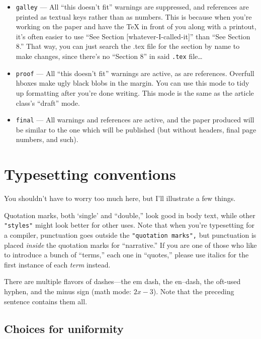 \documentclass[final]{ols}
\begin{document}
\begin{itemize}

\item \texttt{galley} --- All ``this doesn't fit'' warnings are
suppressed, and references are printed as textual keys rather than as
numbers.  This is because when you're working on the paper and have
the TeX in front of you along with a printout, it's often easier to
use ``See Section [whatever-I-called-it]'' than ``See Section 8.''
That way, you can just search the .tex file for the section by name to
make changes, since there's no ``Section 8'' in said \texttt{.tex}
file\ldots

\item \texttt{proof} --- All ``this doesn't fit'' warnings are active,
as are references.  Overfull hboxes make ugly black blobs in the
margin.  You can use this mode to tidy up formatting after you're done
writing.  This mode is the same as the article class's ``draft'' mode.

\item \texttt{final} --- All warnings and references are active, and
the paper produced will be similar to the one which will be
published (but without headers, final page numbers, and such).
\end{itemize}

\section{Typesetting conventions}

You shouldn't have to worry too much here, but I'll illustrate a few
things.

Quotation marks, both `single' and ``double,'' look good in body text,
while other \texttt{"styles"} might look better for other uses.  Note
that when you're typesetting for a compiler, punctuation goes outside
the \texttt{"quotation marks",} but punctuation is placed
\textit{inside} the quotation marks for ``narrative.''
If you are one of those who like to introduce a bunch of ``terms,'' each
one in ``quotes,'' please use italics for the first instance of each
\textit{term} instead. 

There are multiple flavors of dashes---the em dash, the en--dash, the
oft-used hyphen, and the minus sign (math mode: $2x - 3$).  Note that
the preceding sentence contains them all.

\subsection{Choices for uniformity}
\end{document}
